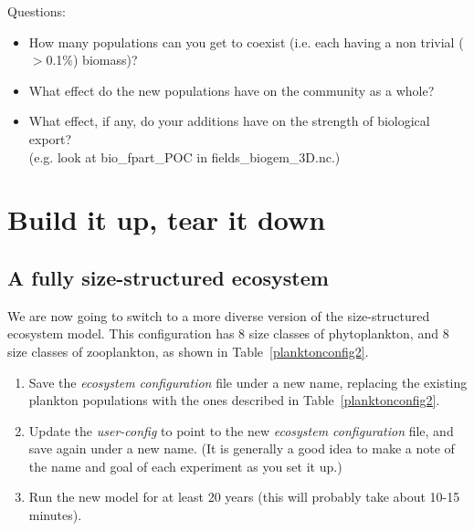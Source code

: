 \documentclass[11pt,fleqn]{book} %
\begin{document}
\vspace{1mm}
Questions:
\vspace{1mm}
\begin{itemize}
\item How many populations can you get to coexist (i.e. each having a non trivial ($>$0.1\%) biomass)?
\item What effect do the new populations have on the community as a whole?
\item What effect, if any, do your additions have on the strength of biological export?\\(e.g. look at \textsf{\footnotesize bio\_fpart\_POC} in \textsf{\footnotesize fields\_biogem\_3D.nc}.)
\end{itemize}
\vspace{2mm}


\newpage


\section{Build it up, tear it down}


\subsection{A fully size-structured  ecosystem} We are now going to switch to a more diverse version of the size-structured ecosystem model. This configuration has 8 size classes of phytoplankton, and 8 size classes of zooplankton, as shown in Table~\ref{planktonconfig2}.

\begin{enumerate}[noitemsep]
\vspace{1mm}
\item Save the \textit{ecosystem configuration} file under a new name, replacing the existing plankton populations with the ones described in Table~\ref{planktonconfig2}.
\vspace{1mm}
\item Update the \textit{user-config} to point to the new \textit{ecosystem configuration} file, and save again under a new name. (It is generally a good idea to make a note of the name and goal of each experiment as you set it up.)
\vspace{1mm}
\item Run the new model for at least 20 years (this will probably take about 10-15 minutes).
\end{enumerate}
\vspace{2mm}
\end{document}
